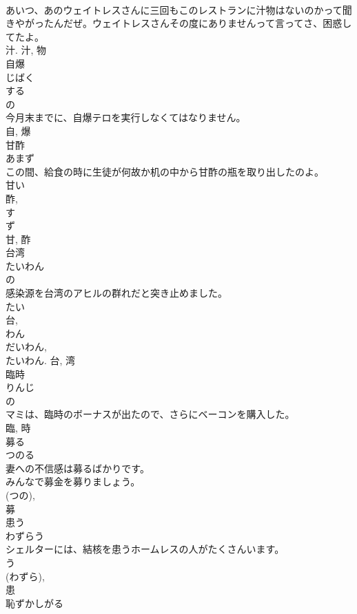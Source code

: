 \documentclass[8pt]{extreport}
\begin{document}
\begin{CJK}{UTF8}{min}
\\	あいつ、あのウェイトレスさんに三回もこのレストランに汁物はないのかって聞きやがったんだぜ。ウェイトレスさんその度にありませんって言ってさ、困惑してたよ。	
\\	汁.	汁, 物	
\\	自爆	
\\	じばく	
\\	する 
\\	の 
\\	今月末までに、自爆テロを実行しなくてはなりません。	
\\	自, 爆	
\\	甘酢	
\\	あまず	
\\	この間、給食の時に生徒が何故か机の中から甘酢の瓶を取り出したのよ。	
\\	甘い 
\\	酢, 
\\	す 
\\	ず 
\\	甘, 酢	
\\	台湾	
\\	たいわん	
\\	の 
\\	感染源を台湾のアヒルの群れだと突き止めました。	
\\	たい 
\\	台, 
\\	わん 
\\	だいわん, 
\\	たいわん.	台, 湾	
\\	臨時	
\\	りんじ	
\\	の 
\\	マミは、臨時のボーナスが出たので、さらにベーコンを購入した。	
\\	臨, 時	
\\	募る	
\\	つのる	
\\	妻への不信感は募るばかりです。	
\\	みんなで募金を募りましょう。	
\\	(つの), 
\\	募	
\\	患う	
\\	わずらう	
\\	シェルターには、結核を患うホームレスの人がたくさんいます。	
\\	う 
\\	(わずら), 
\\	患	
\\	恥ずかしがる	

\end{CJK}
\end{document}
